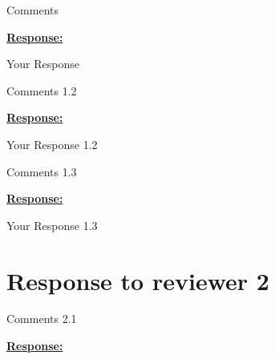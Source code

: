 \documentclass{article}
\begin{document}
\vspace{0.3cm}


\begin{cmt*}{}{}        %

Comments

\end{cmt*}
\vspace{0.1cm}
\noindent
\underline{\textbf{Response:}}
\vspace{0.2cm}

Your Response 

\vspace{0.3cm}


\begin{cmt}{}{}

Comments 1.2

\end{cmt}
\vspace{0.1cm}
\noindent
\underline{\textbf{Response:}}
\vspace{0.2cm}

Your Response 1.2

\vspace{0.3cm}


\begin{cmt}{}{}

Comments 1.3

\end{cmt}
\vspace{0.1cm}
\noindent
\underline{\textbf{Response:}}
\vspace{0.2cm}

Your Response 1.3

\vspace{0.3cm}



\newpage
\section{Response to reviewer 2}

\begin{cmt}{}{}

Comments 2.1

\end{cmt}
\vspace{0.1cm}
\noindent
\underline{\textbf{Response:}}
\vspace{0.2cm}
\end{document}
